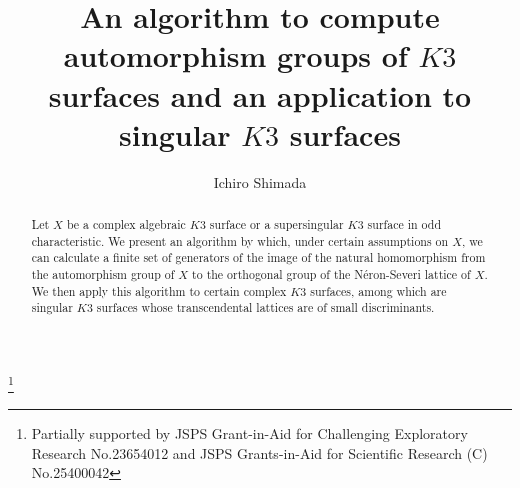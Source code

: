 \documentclass{amsart}
\theoremstyle{plain}
\theoremstyle{definition}
\theoremstyle{remark}
\numberwithin{equation}{section}
\numberwithin{table}{section}
\numberwithin{figure}{section}
\begin{document}
%

\title[Automorphism groups of $K3$ surfaces]
{An algorithm to compute  automorphism groups of $K3$ surfaces
and an application to singular $K3$ surfaces}





\author{Ichiro Shimada}
\address{
Department of Mathematics, 
Graduate School of Science, 
Hiroshima University,
1-3-1 Kagamiyama, 
Higashi-Hiroshima, 
739-8526 JAPAN
}


\thanks{Partially supported by
JSPS Grant-in-Aid for Challenging Exploratory Research No.23654012
and 
JSPS Grants-in-Aid for Scientific Research (C) No.25400042 
}


\begin{abstract}
Let $X$ be a  complex algebraic  $K3$ surface or a supersingular $K3$ surface in odd characteristic.
We present an algorithm by which,
under certain assumptions on $X$,
we can calculate a finite set of generators 
of the image of the natural homomorphism from the automorphism group of  $X$ to 
the orthogonal group of the  N\'eron-Severi lattice of $X$.
We then apply this algorithm to certain complex $K3$ surfaces,
among which are  singular $K3$ surfaces whose transcendental lattices are of small discriminants.
\end{abstract}


\maketitle

\end{document}
